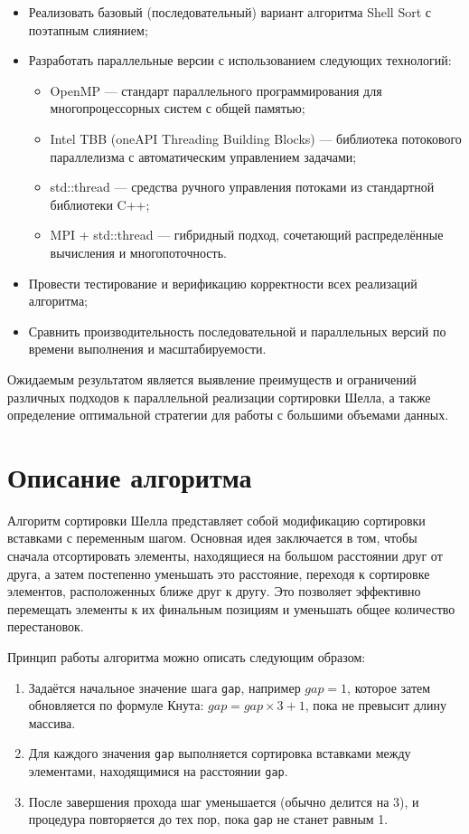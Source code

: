\documentclass[12pt]{article}
\begin{document}
\begin{itemize}
\item Реализовать базовый (последовательный) вариант алгоритма Shell Sort с поэтапным слиянием;
\item Разработать параллельные версии с использованием следующих технологий:
\begin{itemize}
\item OpenMP — стандарт параллельного программирования для многопроцессорных систем с общей памятью;
\item Intel TBB (oneAPI Threading Building Blocks) — библиотека потокового параллелизма с автоматическим управлением задачами;
\item std::thread — средства ручного управления потоками из стандартной библиотеки C++;
\item MPI + std::thread — гибридный подход, сочетающий распределённые вычисления и многопоточность.
\end{itemize}
\item Провести тестирование и верификацию корректности всех реализаций алгоритма;
\item Сравнить производительность последовательной и параллельных версий по времени выполнения и масштабируемости.
\end{itemize}

Ожидаемым результатом является выявление преимуществ и ограничений различных подходов к параллельной реализации сортировки Шелла, а также определение оптимальной стратегии для работы с большими объемами данных.

\section{Описание алгоритма}

Алгоритм сортировки Шелла представляет собой модификацию сортировки вставками с переменным шагом. Основная идея заключается в том, чтобы сначала отсортировать элементы, находящиеся на большом расстоянии друг от друга, а затем постепенно уменьшать это расстояние, переходя к сортировке элементов, расположенных ближе друг к другу. Это позволяет эффективно перемещать элементы к их финальным позициям и уменьшать общее количество перестановок.

Принцип работы алгоритма можно описать следующим образом:
\begin{enumerate}
\item Задаётся начальное значение шага \texttt{gap}, например \( gap = 1 \), которое затем обновляется по формуле Кнута: \( gap = gap \times 3 + 1 \), пока не превысит длину массива.
\item Для каждого значения \texttt{gap} выполняется сортировка вставками между элементами, находящимися на расстоянии \texttt{gap}.
\item После завершения прохода шаг уменьшается (обычно делится на 3), и процедура повторяется до тех пор, пока \texttt{gap} не станет равным 1.
\end{enumerate}
\end{document}
